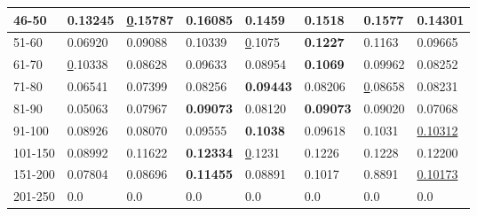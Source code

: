 \begin{table*}[]
\begin{tabular}{|l|l|l|l|l|l|l||l|}
        46-50       & 0.13245                        & {\ul 0.15787}                  & \textbf{0.16085}               & 0.1459                         & 0.1518                         & 0.1577                          & 0.14301                    \\ \hline
        51-60       & 0.06920                        & 0.09088                        & 0.10339                        & {\ul 0.1075}                   & \textbf{0.1227}                & 0.1163                          & 0.09665                    \\ \hline
        61-70       & {\ul 0.10338}                  & 0.08628                        & 0.09633                        & 0.08954                        & \textbf{0.1069}                & 0.09962                         & 0.08252                    \\ \hline
        71-80       & 0.06541                        & 0.07399                        & 0.08256                        & \textbf{0.09443}               & 0.08206                        & {\ul 0.08658}                   & 0.08231                    \\ \hline
        81-90       & 0.05063                        & 0.07967                        & \textbf{0.09073}               & 0.08120                        & \textbf{0.09073}               & 0.09020                         & 0.07068                    \\ \hline
        91-100      & 0.08926                        & 0.08070                        & 0.09555                        & \textbf{0.1038}                & 0.09618                        & 0.1031                          & \underline{0.10312}        \\ \hline
        101-150     & 0.08992                        & 0.11622                        & \textbf{0.12334}               & {\ul 0.1231}                   & 0.1226                         & 0.1228                          & 0.12200                    \\ \hline
        151-200     & 0.07804                        & 0.08696                        & \textbf{0.11455}               & 0.08891                        & 0.1017                         & 0.8891                          & \underline{0.10173}        \\ \hline
        201-250     & 0.0                            & 0.0                            & 0.0                            & 0.0                            & 0.0                            & 0.0                             & 0.0                        \\ \hline

\end{tabular}
\end{table*}
